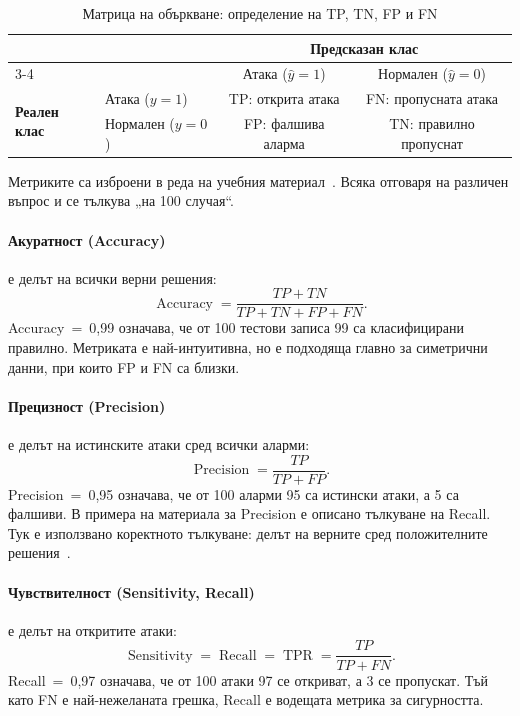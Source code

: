 \begin{table}[H]
\centering\small
\caption{Матрица на объркване: определение на TP, TN, FP и FN}\label{tab:cm}
\begin{tabular}{@{}l l c c@{}}
\toprule
 & & \multicolumn{2}{c}{\textsf{\textbf{Предсказан клас}}}\\
\cmidrule(l){3-4}
 & & Атака ($\hat y=1$) & Нормален ($\hat y=0$)\\
\midrule
\multirow{2}{*}{\textsf{\textbf{Реален клас}}} & Атака ($y=1$) & \cellcolor{boxbg}TP: открита атака & FN: пропусната атака\\
 & Нормален ($y=0$) & FP: фалшива аларма & \cellcolor{boxbg}TN: правилно пропуснат\\
\bottomrule
\end{tabular}
\end{table}

Метриките са изброени в реда на учебния материал~\cite{borovska2022}. Всяка отговаря на различен въпрос и се тълкува „на 100 случая“.

\paragraph{Акуратност (Accuracy)} е делът на всички верни решения:
\begin{equation}\label{eq:accuracy}
\operatorname{Accuracy}=\frac{TP+TN}{TP+TN+FP+FN}.
\end{equation}
Accuracy~=~0,99 означава, че от 100 тестови записа 99 са класифицирани правилно. Метриката е най-интуитивна, но е подходяща главно за симетрични данни, при които FP и FN са близки.

\paragraph{Прецизност (Precision)} е делът на истинските атаки сред всички аларми:
\begin{equation}\label{eq:precision}
\operatorname{Precision}=\frac{TP}{TP+FP}.
\end{equation}
Precision~=~0,95 означава, че от 100 аларми 95 са истински атаки, а 5 са фалшиви. В примера на материала за Precision е описано тълкуване на Recall. Тук е използвано коректното тълкуване: делът на верните сред положителните решения~\cite{fawcett2006}.

\paragraph{Чувствителност (Sensitivity, Recall)} е делът на откритите атаки:
\begin{equation}\label{eq:sensitivity}
\operatorname{Sensitivity}=\operatorname{Recall}=\operatorname{TPR}=\frac{TP}{TP+FN}.
\end{equation}
Recall~=~0,97 означава, че от 100 атаки 97 се откриват, а 3 се пропускат. Тъй като FN е най-нежеланата грешка, Recall е водещата метрика за сигурността.

